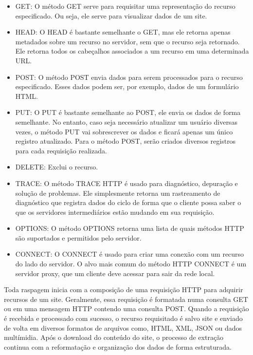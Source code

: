 \documentclass[
  12pt,
  a4paper,
]{scrreprt}
\begin{document}
\begin{itemize}
\item
  GET: O método GET serve para requisitar uma representação do recurso
  especificado. Ou seja, ele serve para visualizar dados de um site.
\item
  HEAD: O HEAD é bastante semelhante o GET, mas ele retorna apenas
  metadados sobre um recurso no servidor, sem que o recurso seja
  retornado. Ele retorna todos os cabeçalhos associados a um recurso em
  uma determinada URL.
\item
  POST: O método POST envia dados para serem processados para o recurso
  especificado. Esses dados podem ser, por exemplo, dados de um
  formulário HTML.
\item
  PUT: O PUT é bastante semelhante ao POST, ele envia os dados de forma
  semelhante. No entanto, caso seja necessário atualizar um usuário
  diversas vezes, o método PUT vai sobrescrever os dados e ficará apenas
  um único registro atualizado. Para o método POST, serão criados
  diversos registros para cada requisição realizada.
\item
  DELETE: Exclui o recurso.
\item
  TRACE: O método TRACE HTTP é usado para diagnóstico, depuração e
  solução de problemas. Ele simplesmente retorna um rastreamento de
  diagnóstico que registra dados do ciclo de forma que o cliente possa
  saber o que os servidores intermediários estão mudando em sua
  requisição.
\item
  OPTIONS: O método OPTIONS retorna uma lista de quais métodos HTTP são
  suportados e permitidos pelo servidor.
\item
  CONNECT: O CONNECT é usado para criar uma conexão com um recurso do
  lado do servidor. O alvo mais comum do método HTTP CONNECT é um
  servidor proxy, que um cliente deve acessar para sair da rede local.
\end{itemize}

Toda raspagem inicia com a composição de uma requisição HTTP para
adquirir recursos de um site. Geralmente, essa requisição é formatada
numa consulta GET ou em uma mensagem HTTP contendo uma consulta POST.
Quando a requisição é recebida e processado com sucesso, o recurso
requisitado é salvo site e enviado de volta em diversos formatos de
arquivos como, HTML, XML, JSON ou dados multímidia. Após o download do
conteúdo do site, o processo de extração continua com a reformatação e
organização dos dados de forma estruturada.

\vspace{12pt}
\end{document}
